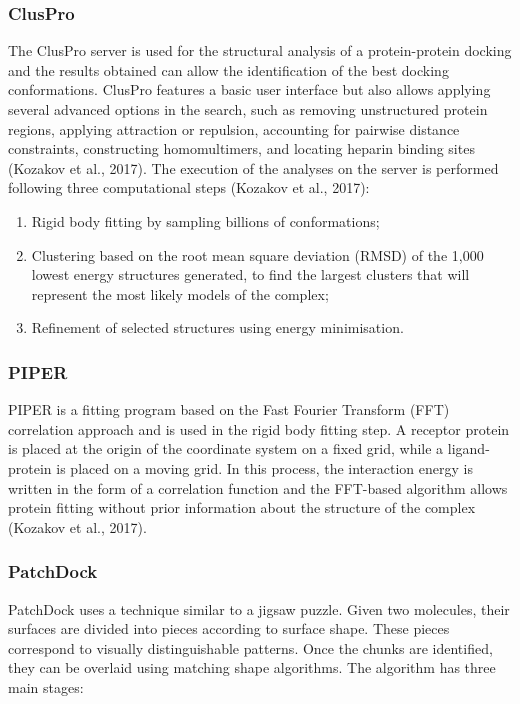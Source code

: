 \documentclass[11pt, letterpaper, english]{article}
\begin{document}
\subsubsection{ClusPro} %

\par{The ClusPro server is used for the structural analysis of a protein-protein docking and the results obtained can allow the identification of the best docking conformations. ClusPro features a basic user interface but also allows applying several advanced options in the search, such as removing unstructured protein regions, applying attraction or repulsion, accounting for pairwise distance constraints, constructing homomultimers, and locating heparin binding sites (Kozakov et al., 2017). The execution of the analyses on the server is performed following three computational steps (Kozakov et al., 2017):} 

\begin{enumerate}
    \item Rigid body fitting by sampling billions of conformations;
    \item Clustering based on the root mean square deviation (RMSD) of the 1,000 lowest energy structures generated, to find the largest clusters that will represent the most likely models of the complex;
    \item Refinement of selected structures using energy minimisation.
\end{enumerate}

\subsubsection{PIPER}

\par{PIPER is a fitting program based on the Fast Fourier Transform (FFT) correlation approach and is used in the rigid body fitting step. A receptor protein is placed at the origin of the coordinate system on a fixed grid, while a ligand-protein is placed on a moving grid. In this process, the interaction energy is written in the form of a correlation function and the FFT-based algorithm allows protein fitting without prior information about the structure of the complex (Kozakov et al., 2017).}

\subsubsection{PatchDock}

\par{PatchDock uses a technique similar to a jigsaw puzzle. Given two molecules, their surfaces are divided into pieces according to surface shape. These pieces correspond to visually distinguishable patterns. Once the chunks are identified, they can be overlaid using matching shape algorithms. The algorithm has three main stages:}
\end{document}
